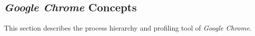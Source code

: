 \subsection{\emph{Google Chrome} Concepts}
This section describes the process hierarchy and profiling tool of \emph{Google Chrome}.

